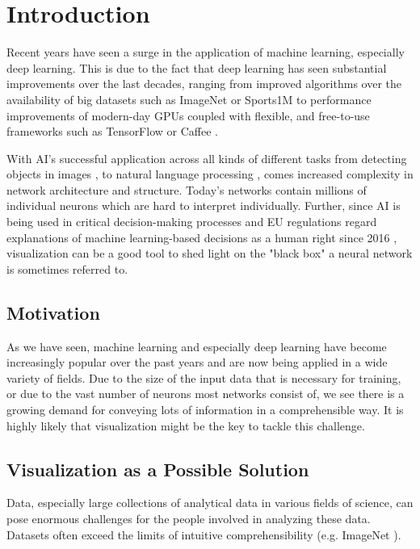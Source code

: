 \documentclass{acmsiggraph}               %
\begin{document}
\keywordlist

\section{Introduction}
Recent years have seen a surge in the application of machine learning, especially deep learning. This is due to the fact that deep learning has seen substantial improvements over the last decades, ranging from improved algorithms \cite{LeCun1998} over the availability of big datasets such as ImageNet \cite{Deng2009} or Sports1M \cite{Karpathy} to performance improvements of modern-day GPUs coupled with flexible, and free-to-use frameworks such as TensorFlow \cite{Abadi2016} or Caffee \cite{Jia2014}.

With AI's successful application across all kinds of different tasks from detecting objects in images \cite{He2015}, to natural language processing \cite{Cho}, comes increased complexity in network architecture and structure. Today's networks contain millions of individual neurons which are hard to interpret individually. Further, since AI is being used in critical decision-making processes and EU regulations regard explanations of machine learning-based decisions as a human right since 2016 \cite{Choo2018}, visualization can be a good tool to shed light on the "black box" a neural network is sometimes referred to. \cite{Shwartz-Ziv2017}


\copyrightspace

\subsection{Motivation}
As we have seen, machine learning and especially deep learning have become increasingly popular over the past years and are now being applied in a wide variety of fields. Due to the size of the input data that is necessary for training, or due to the vast number of neurons most networks consist of, we see there is a growing demand for conveying lots of information in a comprehensible way. It is highly likely that visualization might be the key to tackle this challenge.

\subsection{Visualization as a Possible Solution}
Data, especially large collections of analytical data in various fields of science, can pose enormous challenges for the people involved in analyzing these data. Datasets often exceed the limits of intuitive comprehensibility (e.g. ImageNet \cite{Deng2009}).
\end{document}
